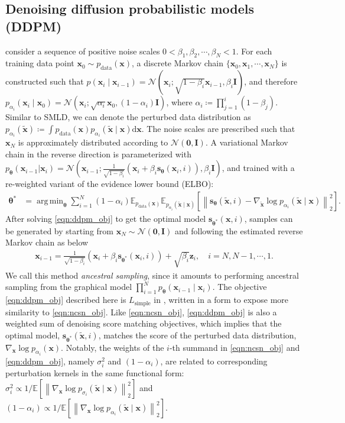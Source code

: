 \documentclass{article} %
\newcommand{\mbb}[1]{\mathbb{#1}}
\newcommand{\ud}{\mathrm{d}}
\newcommand{\mcal}{\mathcal}
\newcommand{\norm}[1]{\left\lVert#1\right\rVert}
\DeclareMathOperator*{\argmin}{arg\,min}
\newcommand{\bfx}{\mathbf{x}}
\newcommand{\bfz}{\mathbf{z}}
\newcommand{\bfI}{\mathbf{I}}
\newcommand{\bfzero}{\mathbf{0}}
\newcommand{\bftheta}{{\boldsymbol{\theta}}}
\newcommand{\bfs}{\mathbf{s}}
\newcommand{\pd}{p_{\mathrm{data}}}
\begin{document}
\subsection{Denoising diffusion probabilistic models (DDPM)}\label{sec:ddpm}
\citet{sohl2015deep,ho2020denoising} consider a sequence of positive noise scales $0 < \beta_1, \beta_2, \cdots, \beta_N < 1$. For each training data point $\bfx_0 \sim \pd(\bfx)$, a discrete Markov chain $\{ \bfx_0, \bfx_1, \cdots, \bfx_N \}$ is constructed such that $p(\bfx_{i} \mid \bfx_{i-1}) = \mcal{N}(\bfx_{i} ; \sqrt{1-\beta_i} \bfx_{i-1}, \beta_i \bfI)$, and therefore $p_{\alpha_i}(\bfx_i \mid \bfx_0) = \mcal{N}(\bfx_i ;\sqrt{\alpha_i} \bfx_0, (1-\alpha_i)\bfI)$, where $\alpha_i \coloneqq \prod_{j=1}^i (1-\beta_j)$. Similar to SMLD, we can denote the perturbed data distribution as $p_{\alpha_i}(\tilde{\bfx}) \coloneqq \int p_\text{data}(\bfx) p_{\alpha_i}(\tilde{\bfx} \mid \bfx) \ud \bfx$. The noise scales are prescribed such that %
$\bfx_N$ is approximately distributed according to $\mcal{N}(\bfzero, \bfI)$. A variational Markov chain in the reverse direction is parameterized with $p_\bftheta(\bfx_{i-1} | \bfx_{i}) = \mcal{N}(\bfx_{i-1}; \frac{1}{\sqrt{1-\beta_i}} (\bfx_i + \beta_i \bfs_\bftheta(\bfx_i, i)), \beta_i \bfI)$, and trained with a re-weighted variant of the evidence lower bound (ELBO):
\begin{align}
\bftheta^* &= \argmin_\bftheta
    \sum_{i=1}^{N} (1-\alpha_i) \mbb{E}_{\pd(\bfx)}\mbb{E}_{p_{\alpha_i}(\tilde{\bfx} \mid \bfx)}[\norm{ \bfs_\bftheta(\tilde{\bfx}, i) - \nabla_{\tilde{\bfx}} \log p_{\alpha_i}(\tilde{\bfx} \mid \bfx)}_2^2]. \label{eqn:ddpm_obj}
\end{align}
After solving \cref{eqn:ddpm_obj} to get the optimal model $\bfs_{\bftheta^*}(\bfx, i)$, samples can be generated by starting from $\bfx_N \sim \mcal{N}(\bfzero, \bfI)$ and following the estimated reverse Markov chain as below
\begin{align}
    \bfx_{i-1} = \frac{1}{\sqrt{1-\beta_i}} (\bfx_i + \beta_i \bfs_{\bftheta^*}(\bfx_i, i)) + \sqrt{\beta_i}\bfz_i, \quad i=N, N-1, \cdots, 1. \label{eqn:ddpm_sampling}
\end{align}
We call this method \emph{ancestral sampling}, since it amounts to performing ancestral sampling from the graphical model $\prod_{i=1}^N p_\bftheta(\bfx_{i-1} \mid \bfx_i)$. The objective \cref{eqn:ddpm_obj} described here is $L_{\text{simple}}$ in \citet{ho2020denoising}, written in a form to expose more similarity to \cref{eqn:ncsn_obj}. 
Like \cref{eqn:ncsn_obj}, \cref{eqn:ddpm_obj} is also a weighted sum of denoising score matching objectives, which implies that the optimal model, $\bfs_{\bftheta^*}(\tilde{\bfx}, i)$, matches the score of the perturbed data distribution, $\nabla_\bfx \log p_{\alpha_i}(\bfx)$. Notably, the weights of the $i$-th summand in \cref{eqn:ncsn_obj} and \cref{eqn:ddpm_obj}, namely $\sigma_i^2$ and $(1-\alpha_i)$, are related to corresponding perturbation kernels in the same functional form: $\sigma_i^2 \propto 1/\mbb{E}[\norm{\nabla_\bfx \log p_{\sigma_i}(\tilde{\bfx} \mid \bfx)}_2^2]$ and $(1-\alpha_i) \propto 1/\mbb{E}[\norm{\nabla_\bfx \log p_{\alpha_i}(\tilde{\bfx} \mid \bfx)}_2^2]$. %
\end{document}
